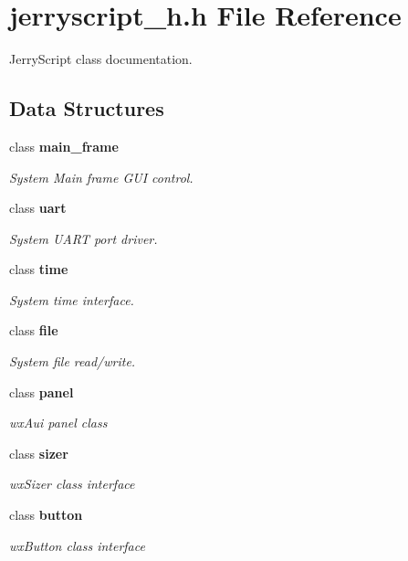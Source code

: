 \section{jerryscript\+\_\+h.\+h File Reference}
\label{jerryscript__h_8h}


Jerry\+Script class documentation.  


\subsection*{Data Structures}
\begin{DoxyCompactItemize}
\item 
class \textbf{ main\+\_\+frame}
\begin{DoxyCompactList}\small\item\em System Main frame G\+UI control. \end{DoxyCompactList}\item 
class \textbf{ uart}
\begin{DoxyCompactList}\small\item\em System U\+A\+RT port driver. \end{DoxyCompactList}\item 
class \textbf{ time}
\begin{DoxyCompactList}\small\item\em System time interface. \end{DoxyCompactList}\item 
class \textbf{ file}
\begin{DoxyCompactList}\small\item\em System file read/write. \end{DoxyCompactList}\item 
class \textbf{ panel}
\begin{DoxyCompactList}\small\item\em wx\+Aui panel class \end{DoxyCompactList}\item 
class \textbf{ sizer}
\begin{DoxyCompactList}\small\item\em wx\+Sizer class interface \end{DoxyCompactList}\item 
class \textbf{ button}
\begin{DoxyCompactList}\small\item\em wx\+Button class interface \end{DoxyCompactList}\item 

\end{DoxyCompactItemize}
